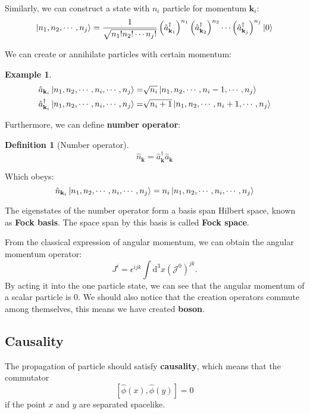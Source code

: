 \documentclass[12pt]{article}
\numberwithin{equation}{section}
\theoremstyle{1style}
\newtheorem{definition}[equation]{Definition}
\newtheorem{example}[equation]{Example}
\newcommand{\tbf}[1]{\textbf{#1}}
\newcommand{\id}{\mathrm{d}}
\begin{document}
Similarly, we can construct a state with \(n_{i}\) particle for momentum \(\mathbf{k}_i\):
\begin{equation}
  \ket{n_1,n_2,\cdots,n_j}=\frac{1}{\sqrt{n_1!n_2!\cdots n_j!}}\left(\hat{a}^{\dagger}_{\mathbf{k}_1}\right)^{n_1}
  \left(\hat{a}^{\dagger}_{\mathbf{k}_2}\right)^{n_2}\cdots \left(\hat{a}^{\dagger}_{\mathbf{k}_j}\right)^{n_j}\ket{0}
\end{equation}

We can create or annihilate particles with certain momentum:
\begin{example}
  \begin{align*}
    \hat{a}_{\mathbf{k}_i}\ket{n_1,n_2,\cdots,n_i,\cdots,n_j}=           & \sqrt{n_i}\ket{n_1,n_2,\cdots,n_i-1,\cdots,n_j}   \\
    \hat{a}^{\dagger}_{\mathbf{k}_i}\ket{n_1,n_2,\cdots,n_i,\cdots,n_j}= & \sqrt{n_i+1}\ket{n_1,n_2,\cdots,n_i+1,\cdots,n_j}
  \end{align*}
\end{example}

Furthermore, we can define \tbf{number operator}:
\begin{definition}[Number operator]
  \[\hat{n}_{\mathbf{k}}=\hat{a}^\dagger_{\mathbf{k}}\hat{a}_{\mathbf{k}}\]
\end{definition}

Which obeys:
\begin{equation}
  \hat{n}_{\mathbf{k}_i}\ket{n_1,n_2,\cdots,n_i,\cdots,n_j}=    n_i\ket{n_1,n_2,\cdots,n_i,\cdots,n_j}
\end{equation}

The eigenstates of the number operator form a basis span Hilbert space, known as \tbf{Fock basis}.
The space span by this basis is called \tbf{Fock space}.

From the classical expression of angular momentum, we can obtain the angular momentum operator:
\begin{equation}
  J^{i}=\epsilon^{ijk}\int\id^3x(\mathcal{J}^0)^{jk}.
\end{equation}
By acting it into the one particle state, we can see that the angular momentum of a scalar particle is 0.
We should also notice that the creation operators commute among themselves, this means we have created \tbf{boson}.



\subsection{Causality}
The propagation of particle should satisfy \tbf{causality}, which means that the commutator
\[\left[\hat{\phi}(x),\hat{\phi}(y)\right]=0\]
if the point \(x\) and \(y\) are separated spacelike.
\end{document}
